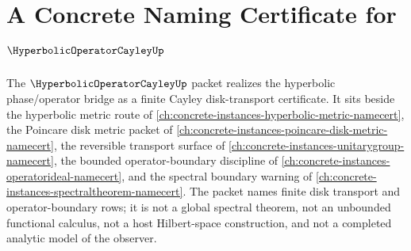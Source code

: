 \chapter{A Concrete Naming Certificate for $\HyperbolicOperatorCayleyUp$}
\label{ch:concrete-instances-hyperbolic-operator-cayley-namecert}

The $\HyperbolicOperatorCayleyUp$ packet realizes the hyperbolic phase/operator bridge as a finite Cayley disk-transport certificate. It sits beside the hyperbolic metric route of \autoref{ch:concrete-instances-hyperbolic-metric-namecert}, the Poincare disk metric packet of \autoref{ch:concrete-instances-poincare-disk-metric-namecert}, the reversible transport surface of \autoref{ch:concrete-instances-unitarygroup-namecert}, the bounded operator-boundary discipline of \autoref{ch:concrete-instances-operatorideal-namecert}, and the spectral boundary warning of \autoref{ch:concrete-instances-spectraltheorem-namecert}. The packet names finite disk transport and operator-boundary rows; it is not a global spectral theorem, not an unbounded functional calculus, not a host Hilbert-space construction, and not a completed analytic model of the observer.

